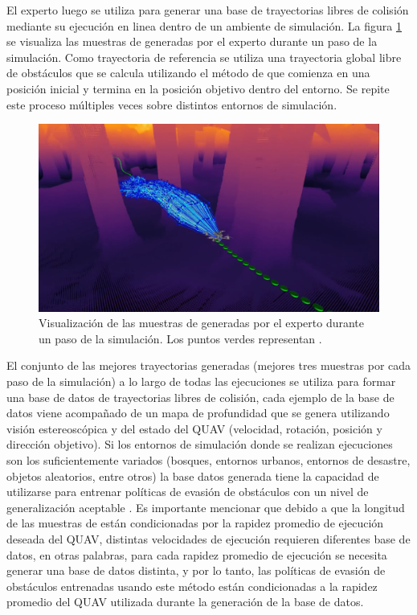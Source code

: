El experto luego se utiliza para generar una base de trayectorias libres de colisión mediante su ejecución en linea dentro de un ambiente de simulación. La figura \ref{fig:prev-aoa-expert-sample} se visualiza las muestras de  generadas por el experto durante un paso de la simulación. Como trayectoria de referencia se utiliza una trayectoria global libre de obstáculos que se calcula utilizando el método de \cite{liu2018search} que comienza en una posición inicial y termina en la posición objetivo dentro del entorno. Se repite este proceso múltiples veces sobre distintos entornos de simulación. 

\begin{figure}[H]
    \centering
    \includegraphics[scale=0.2]{partes/img/aoa-expert-sample.png}
    \caption[Visualización de las muestras de  generadas por el experto durante un paso de la simulación.]{Visualización de las muestras de  generadas por el experto durante un paso de la simulación. Los puntos verdes representan .}
    \label{fig:prev-aoa-expert-sample}
\end{figure}


El conjunto de las mejores trayectorias generadas (mejores tres muestras por cada paso de la simulación) a lo largo de todas las ejecuciones se utiliza para formar una base de datos de trayectorias libres de colisión, cada ejemplo de la base de datos viene acompañado de un mapa de profundidad que se genera utilizando visión estereoscópica y del estado del QUAV (velocidad, rotación, posición y dirección objetivo). Si los entornos de simulación donde se realizan ejecuciones son los suficientemente variados (bosques, entornos urbanos, entornos de desastre, objetos aleatorios, entre otros) la base datos generada tiene la capacidad de utilizarse para entrenar políticas de evasión de obstáculos con un nivel de generalización aceptable \cite{Loquercio2021}. Es importante mencionar que debido a que la longitud de las muestras de  están condicionadas por la rapidez promedio de ejecución deseada del QUAV, distintas velocidades de ejecución requieren diferentes base de datos, en otras palabras, para cada rapidez promedio de ejecución se necesita generar una base de datos distinta, y por lo tanto, las políticas de evasión de obstáculos entrenadas usando este método están condicionadas a la rapidez promedio del QUAV utilizada durante la generación de la base de datos.

